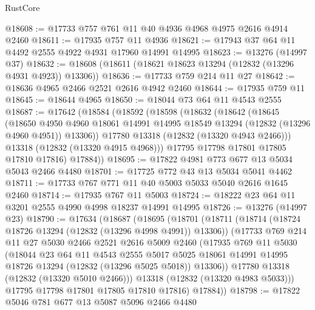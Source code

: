 \begin{lexlean}{RustCore}
\begin{coremodule}
@18608 := @17733 @757 @761 @11 @40 @4936 @4968 @4975 @2616 @4914 @2460
@18611 := @17935 @757 @11 @4936
@18621 := @17943 @37 @64 @11 @4492 @2555 @4922 @4931 @17960 @14991 @14995
@18623 := @13276 (@14997 @37)
@18632 := @18608 (@18611 (@18621 @18623 @13294 (@12832 (@13296 @4931 @4923)) @13306))
@18636 := @17733 @759 @214 @11 @27
@18642 := @18636 @4965 @2466 @2521 @2616 @4942 @2460
@18644 := @17935 @759 @11
@18645 := @18644 @4965
@18650 := @18044 @73 @64 @11 @4543 @2555
@18687 := @17642
    (@18584
      (@18592
        (@18598
          (@18632
            (@18642
              (@18645
                (@18650
                  @4950
                  @4960
                  @18061
                  @14991
                  @14995
                  @18549
                  @13294
                  (@12832 (@13296 @4960 @4951))
                  @13306))
              @17780
              @13318
              (@12832 (@13320 @4943 @2466)))
            @13318
            (@12832 (@13320 @4915 @4968)))
          @17795
          @17798
          @17801
          @17805
          @17810
          @17816)
        @17884))
@18695 := @17822 @4981 @773 @677 @13 @5034 @5043 @2466 @4480
@18701 := @17725 @772 @43 @13 @5034 @5041 @4462
@18711 := @17733 @767 @771 @11 @40 @5003 @5033 @5040 @2616 @1645 @2460
@18714 := @17935 @767 @11 @5003
@18724 := @18222 @23 @64 @11 @3201 @2555 @4990 @4998 @18237 @14991 @14995
@18726 := @13276 (@14997 @23)
@18790 := @17634
    (@18687
      (@18695
        (@18701
          (@18711
            (@18714 (@18724 @18726 @13294 (@12832 (@13296 @4998 @4991)) @13306))
            (@17733
              @769
              @214
              @11
              @27
              @5030
              @2466
              @2521
              @2616
              @5009
              @2460
              (@17935
                @769
                @11
                @5030
                (@18044
                  @23
                  @64
                  @11
                  @4543
                  @2555
                  @5017
                  @5025
                  @18061
                  @14991
                  @14995
                  @18726
                  @13294
                  (@12832 (@13296 @5025 @5018))
                  @13306))
              @17780
              @13318
              (@12832 (@13320 @5010 @2466)))
            @13318
            (@12832 (@13320 @4983 @5033)))
          @17795
          @17798
          @17801
          @17805
          @17810
          @17816)
        @17884))
@18798 := @17822 @5046 @781 @677 @13 @5087 @5096 @2466 @4480

\end{coremodule}
\end{lexlean}
